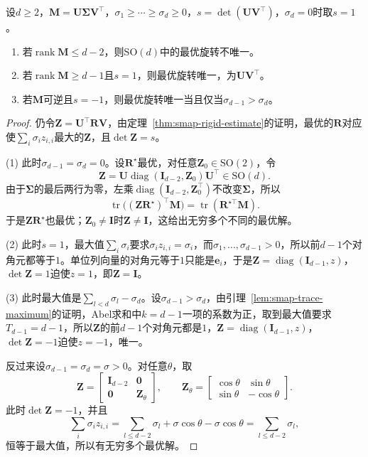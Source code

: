 \begin{theorem}[旋转估计的唯一性]
\label{thm:smap-rotation-uniqueness}
设$d\geq2$，$\bm M=\bm U\bm\Sigma\bm V^\top$，$\sigma_1\geq\cdots\geq\sigma_d\geq0$，$s=\det(\bm U\bm V^\top)$，$\sigma_d=0$时取$s=1$。
\begin{enumerate}
 \item 若$\operatorname{rank}\bm M\leq d-2$，则$\mathrm{SO}(d)$中的最优旋转不唯一。
 \item 若$\operatorname{rank}\bm M\geq d-1$且$s=1$，则最优旋转唯一，为$\bm U\bm V^\top$。
 \item 若$\bm M$可逆且$s=-1$，则最优旋转唯一当且仅当$\sigma_{d-1}>\sigma_d$。
\end{enumerate}
\end{theorem}
\begin{proof}
仍令$\bm Z=\bm U^\top\bm R\bm V$，由定理~\ref{thm:smap-rigid-estimate}的证明，最优的$\bm R$对应使$\sum_i\sigma_iz_{i,i}$最大的$\bm Z$，且$\det\bm Z=s$。

(1) 此时$\sigma_{d-1}=\sigma_d=0$。设$\bm R^\star$最优，对任意$\bm Z_0\in\mathrm{SO}(2)$，令
\[
 \bm Z=\bm U\operatorname{diag}(\bm I_{d-2},\bm Z_0)\bm U^\top\in\mathrm{SO}(d).
\]
由于$\bm\Sigma$的最后两行为零，左乘$\operatorname{diag}(\bm I_{d-2},\bm Z_0^\top)$不改变$\bm\Sigma$，所以
\[
 \operatorname{tr}\bigl((\bm Z\bm R^\star)^\top\bm M\bigr)=\operatorname{tr}(\bm R^{\star\top}\bm M) .
\]
于是$\bm Z\bm R^\star$也最优；$\bm Z_0\neq\bm I$时$\bm Z\neq\bm I$，这给出无穷多个不同的最优解。

(2) 此时$s=1$，最大值$\sum_i\sigma_i$要求$\sigma_iz_{i,i}=\sigma_i$，而$\sigma_1,\ldots,\sigma_{d-1}>0$，所以前$d-1$个对角元都等于$1$。单位列向量的对角元等于$1$只能是$\bm e_i$，于是$\bm Z=\operatorname{diag}(\bm I_{d-1},z)$，$\det\bm Z=1$迫使$z=1$，即$\bm Z=\bm I$。

(3) 此时最大值是$\sum_{l<d}\sigma_l-\sigma_d$。设$\sigma_{d-1}>\sigma_d$，由引理~\ref{lem:smap-trace-maximum}的证明，Abel求和中$k=d-1$一项的系数为正，取到最大值要求$T_{d-1}=d-1$，所以$\bm Z$的前$d-1$个对角元都是$1$，$\bm Z=\operatorname{diag}(\bm I_{d-1},z)$，$\det\bm Z=-1$迫使$z=-1$，唯一。

反过来设$\sigma_{d-1}=\sigma_d=\sigma>0$。对任意$\theta$，取
\[
 \bm Z=\begin{bmatrix}\bm I_{d-2}&\bm0\\\bm0&\bm Z_\theta\end{bmatrix},\qquad
 \bm Z_\theta=\begin{bmatrix}\cos\theta&\sin\theta\\\sin\theta&-\cos\theta\end{bmatrix} .
\]
此时$\det\bm Z=-1$，并且
\[
 \sum_i\sigma_iz_{i,i}=\sum_{l\leq d-2}\sigma_l+\sigma\cos\theta-\sigma\cos\theta=\sum_{l\leq d-2}\sigma_l ,
\]
恒等于最大值，所以有无穷多个最优解。
\end{proof}

